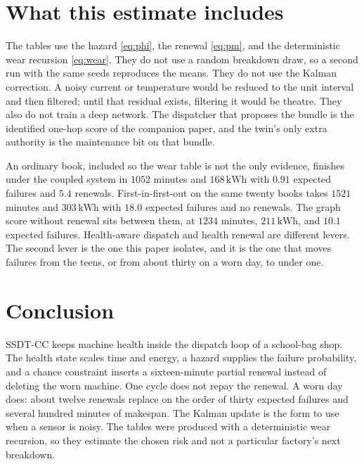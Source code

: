 \documentclass[10pt,a4paper]{article}
\begin{document}
\section{What this estimate includes}

The tables use the hazard \eqref{eq:phi}, the renewal \eqref{eq:pm}, and the deterministic wear recursion \eqref{eq:wear}. They do not use a random breakdown draw, so a second run with the same seeds reproduces the means. They do not use the Kalman correction. A noisy current or temperature would be reduced to the unit interval and then filtered; until that residual exists, filtering it would be theatre. They also do not train a deep network. The dispatcher that proposes the bundle is the identified one-hop score of the companion paper, and the twin's only extra authority is the maintenance bit on that bundle.

An ordinary book, included so the wear table is not the only evidence, finishes under the coupled system in \(1052\) minutes and \(168\,\mathrm{kWh}\) with \(0.91\) expected failures and \(5.4\) renewals. First-in-first-out on the same twenty books takes \(1521\) minutes and \(303\,\mathrm{kWh}\) with \(18.0\) expected failures and no renewals. The graph score without renewal sits between them, at \(1234\) minutes, \(211\,\mathrm{kWh}\), and \(10.1\) expected failures. Health-aware dispatch and health renewal are different levers. The second lever is the one this paper isolates, and it is the one that moves failures from the teens, or from about thirty on a worn day, to under one.

\section{Conclusion}

SSDT-CC keeps machine health inside the dispatch loop of a school-bag shop. The health state scales time and energy, a hazard supplies the failure probability, and a chance constraint inserts a sixteen-minute partial renewal instead of deleting the worn machine. One cycle does not repay the renewal. A worn day does: about twelve renewals replace on the order of thirty expected failures and several hundred minutes of makespan. The Kalman update is the form to use when a sensor is noisy. The tables were produced with a deterministic wear recursion, so they estimate the chosen risk and not a particular factory's next breakdown.
\end{document}
